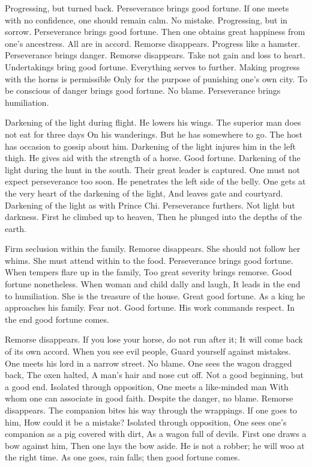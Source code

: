 {Progressing, but turned back.
 Perseverance brings good fortune.
 If one meets with no confidence, one should remain calm.
 No mistake.}
{Progressing, but in sorrow.
 Perseverance brings good fortune.
 Then one obtains great happiness from one’s ancestress.}
{All are in accord. Remorse disappears.}
{Progress like a hamster.
 Perseverance brings danger.}
{Remorse disappears.
 Take not gain and loss to heart.
 Undertakings bring good fortune.
 Everything serves to further.}
{Making progress with the horns is permissible
 Only for the purpose of punishing one’s own city.
 To be conscious of danger brings good fortune.
 No blame.
 Perseverance brings humiliation.}

{Darkening of the light during flight.
 He lowers his wings.
 The superior man does not eat for three days
 On his wanderings.
 But he has somewhere to go.
 The host has occasion to gossip about him.}
{Darkening of the light injures him in the left thigh.
 He gives aid with the strength of a horse.
 Good fortune.}
{Darkening of the light during the hunt in the south.
 Their great leader is captured.
 One must not expect perseverance too soon.}
{He penetrates the left side of the belly.
 One gets at the very heart of the darkening of the light,
 And leaves gate and courtyard.}
{Darkening of the light as with Prince Chi.
 Perseverance furthers.}
{Not light but darkness.
 First he climbed up to heaven,
 Then he plunged into the depths of the earth.}

{Firm seclusion within the family.
 Remorse disappears.}
{She should not follow her whims.
 She must attend within to the food.
 Perseverance brings good fortune.}
{When tempers flare up in the family,
 Too great severity brings remorse.
 Good fortune nonetheless.
 When woman and child dally and laugh,
 It leads in the end to humiliation.}
{She is the treasure of the house.
 Great good fortune.}
{As a king he approaches his family.
 Fear not.
 Good fortune.}
{His work commands respect.
 In the end good fortune comes.}

{Remorse disappears.
 If you lose your horse, do not run after it;
 It will come back of its own accord.
 When you see evil people,
 Guard yourself against mistakes.}
{One meets his lord in a narrow street.
 No blame.}
{One sees the wagon dragged back,
 The oxen halted,
 A man’s hair and nose cut off.
 Not a good beginning, but a good end.}
{Isolated through opposition,
 One meets a like-minded man
 With whom one can associate in good faith.
 Despite the danger, no blame.}
{Remorse disappears.
 The companion bites his way through the wrappings.
 If one goes to him,
 How could it be a mistake?}
{Isolated through opposition,
 One sees one’s companion as a pig covered with dirt,
 As a wagon full of devils.
 First one draws a bow against him,
 Then one lays the bow aside.
 He is not a robber; he will woo at the right time.
 As one goes, rain falls; then good fortune comes.}

